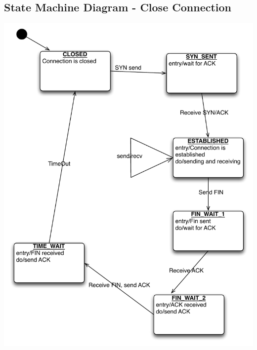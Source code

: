 \documentclass{article}
\begin{document}
\subsection{State Machine Diagram - Close Connection}
\includegraphics[scale=0.95]{KtnStateConnectionClose.pdf}
\end{document}
